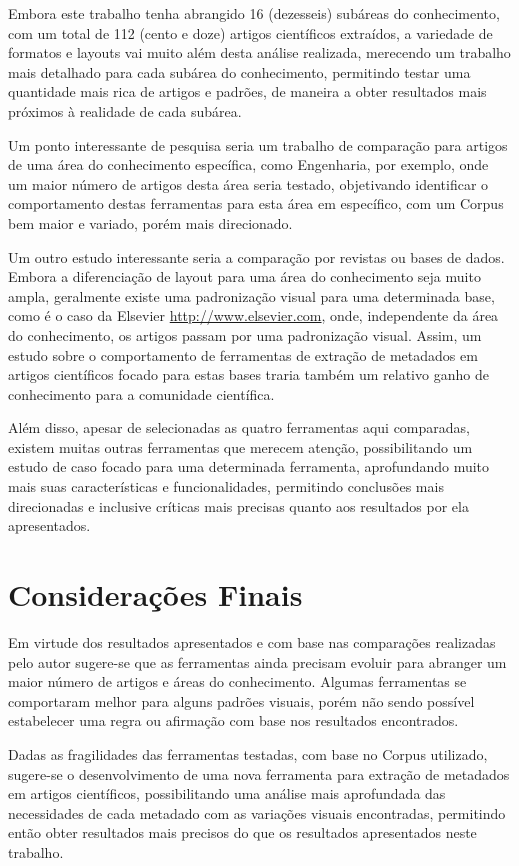 Embora este trabalho tenha abrangido 16 (dezesseis) subáreas do conhecimento, com um total de 112 (cento e doze) artigos científicos extraídos, a variedade de formatos e layouts vai muito além desta análise realizada, merecendo um trabalho mais detalhado para cada subárea do conhecimento, permitindo testar uma quantidade mais rica de artigos e padrões, de maneira a obter resultados mais próximos à realidade de cada subárea.

Um ponto interessante de pesquisa seria um trabalho de comparação para artigos de uma área do conhecimento específica, como Engenharia, por exemplo, onde um maior número de artigos desta área seria testado, objetivando identificar o comportamento destas ferramentas para esta área em específico, com um Corpus bem maior e variado, porém mais direcionado.

Um outro estudo interessante seria a comparação por revistas ou bases de dados. Embora a diferenciação de layout para uma área do conhecimento seja muito ampla, geralmente existe uma padronização visual para uma determinada base, como é o caso da Elsevier \url{http://www.elsevier.com}, onde, independente da área do conhecimento, os artigos passam por uma padronização visual. Assim, um estudo sobre o comportamento de ferramentas de extração de metadados em artigos científicos focado para estas bases traria também um relativo ganho de conhecimento para a comunidade científica.

Além disso, apesar de selecionadas as quatro ferramentas aqui comparadas, existem muitas outras ferramentas que merecem atenção, possibilitando um estudo de caso focado para uma determinada ferramenta, aprofundando muito mais suas características e funcionalidades, permitindo conclusões mais direcionadas e inclusive críticas mais precisas quanto aos resultados por ela apresentados.

\section{Considerações Finais}
\label{sec:final-considerations}

Em virtude dos resultados apresentados e com base nas comparações realizadas pelo autor sugere-se que as ferramentas ainda precisam evoluir para abranger um maior número de artigos e áreas do conhecimento. Algumas ferramentas se comportaram melhor para alguns padrões visuais, porém não sendo possível estabelecer uma regra ou afirmação com base nos resultados encontrados.

Dadas as fragilidades das ferramentas testadas, com base no Corpus utilizado, sugere-se o desenvolvimento de uma nova ferramenta para extração de metadados em artigos científicos, possibilitando uma análise mais aprofundada das necessidades de cada metadado com as variações visuais encontradas, permitindo então obter resultados mais precisos do que os resultados apresentados neste trabalho.

